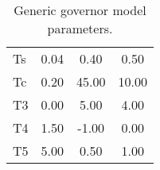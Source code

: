 \begin{table}[!ht]
	\caption{Generic governor model parameters.}
	\label{tab: test2}
	\centering
	\begin{tabular}{@{} C{2cm} S[table-format=2.2] S[table-format=2.2] S[table-format=2.2] @{}} 	
		\toprule %
			&		&		&		\\		
		\midrule		
			Ts	&	0.04	&	0.40	&0.50\\
			Tc	&	0.20	&	45.00	&10.00\\
			T3	&	0.00	&	5.00	&4.00\\
			T4	&	1.50	&	-1.00	&0.00\\
			T5	&	5.00	&	0.50	&1.00\\
		\bottomrule
	\end{tabular}

\end{table}